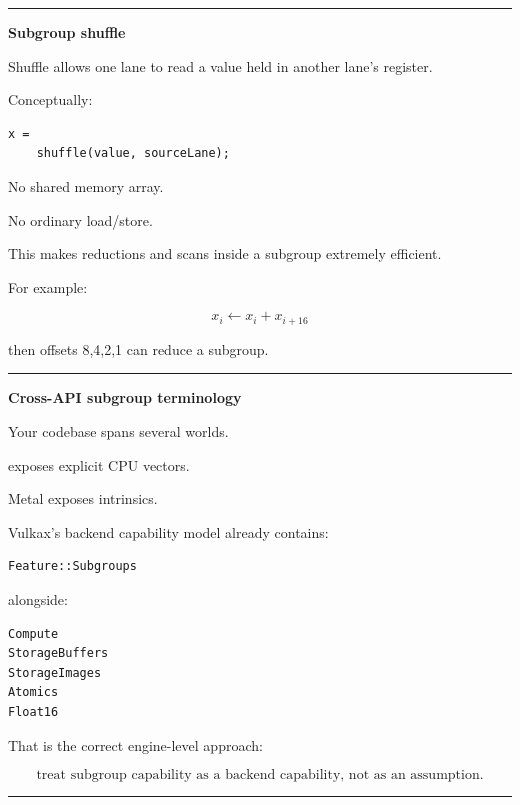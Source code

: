 \begin{center}\rule{0.5\linewidth}{0.5pt}\end{center}

\textbf{Subgroup shuffle}

Shuffle allows one lane to read a value held in another lane's register.

Conceptually:

\protect{}\label{kjzl1q}%
\begin{verbatim}
x =
    shuffle(value, sourceLane);
\end{verbatim}

No shared memory array.

No ordinary load/store.

This makes reductions and scans inside a subgroup extremely efficient.

For example:

\[
x_i
\leftarrow
x_i+x_{i+16}
\]

then offsets 8,4,2,1 can reduce a subgroup.

\begin{center}\rule{0.5\linewidth}{0.5pt}\end{center}

\textbf{Cross-API subgroup terminology}

Your codebase spans several worlds.

 exposes explicit CPU vectors.

Metal exposes  intrinsics.

Vulkax's backend capability model already contains:

\protect{}\label{1hu377}%
\begin{verbatim}
Feature::Subgroups
\end{verbatim}

alongside:

\protect{}\label{4aem6v}%
\begin{verbatim}
Compute
StorageBuffers
StorageImages
Atomics
Float16
\end{verbatim}

That is the correct engine-level approach:

\[
\boxed{
\text{treat subgroup capability as a backend capability, not as an assumption}.
}
\]

\begin{center}\rule{0.5\linewidth}{0.5pt}\end{center}

